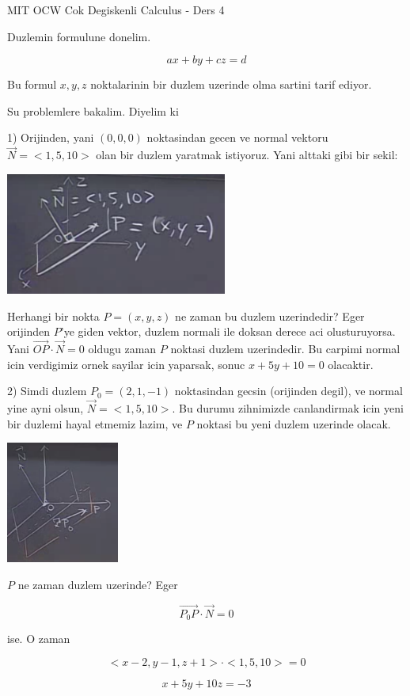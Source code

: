 \documentclass[12pt,fleqn]{article}
\begin{document}
MIT OCW Cok Degiskenli Calculus - Ders 4

Duzlemin formulune donelim. 

\[ ax + by + cz = d \]

Bu formul $x,y,z$ noktalarinin bir duzlem uzerinde olma sartini tarif
ediyor. 

Su problemlere bakalim. Diyelim ki 

1) Orijinden, yani $(0,0,0)$ noktasindan gecen ve normal vektoru $\vec{N} = <1,5,10>$
olan bir duzlem yaratmak istiyoruz. Yani alttaki gibi bir sekil:

\includegraphics[height=4cm]{4_1.png}

Herhangi bir nokta $P = (x,y,z)$  ne zaman bu duzlem uzerindedir? Eger
orijinden $P$'ye giden vektor, duzlem normali ile doksan derece aci
olusturuyorsa. Yani $\vec{OP} \cdot \vec{N} = 0$ oldugu zaman $P$ noktasi
duzlem uzerindedir. Bu carpimi normal icin verdigimiz ornek sayilar icin
yaparsak, sonuc $x+5y+10 = 0$ olacaktir. 

2) Simdi duzlem $P_0 = (2,1,-1)$ noktasindan gecsin (orijinden degil), ve
normal yine ayni olsun, $\vec{N} = <1,5,10>$. Bu durumu zihnimizde
canlandirmak icin yeni bir duzlemi hayal etmemiz lazim, ve $P$ noktasi bu
yeni duzlem uzerinde olacak.

\includegraphics[height=4cm]{4_2.png}

$P$ ne zaman duzlem uzerinde? Eger 

\[ \vec{P_0P} \cdot \vec{N} = 0 \]

ise. O zaman 

\[ <x-2, y-1, z+1> \cdot <1,5,10> = 0 \]

\[ x+5y + 10z = -3 \]
\end{document}

